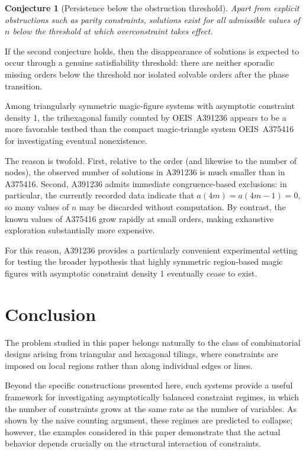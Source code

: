 \documentclass[11pt]{article}
\theoremstyle{plain}
\newtheorem{conjecture}[theorem]{Conjecture}
\theoremstyle{definition}
\begin{document}
\begin{conjecture}[Persistence below the obstruction threshold]
Apart from explicit obstructions such as parity constraints,
solutions exist for all admissible values of $n$ below the threshold
at which overconstraint takes effect.
\end{conjecture}

If the second conjecture holds, then the disappearance of solutions is
expected to occur through a genuine satisfiability threshold: there are
neither sporadic missing orders below the threshold nor isolated
solvable orders after the phase transition.


Among triangularly symmetric magic-figure systems with asymptotic
constraint density 1, the trihexagonal family counted by OEIS~A391236
appears to be a more favorable testbed than the compact magic-triangle
system OEIS~A375416 for investigating eventual nonexistence.

The reason is twofold. First, relative to the order (and likewise to the
number of nodes), the observed number of solutions in A391236 is much
smaller than in A375416. Second, A391236 admits immediate congruence-based
exclusions: in particular, the currently recorded data indicate that
$a(4m)=a(4m-1)=0$, so many values of $n$ may be discarded without
computation. By contrast, the known values of A375416 grow rapidly at
small orders, making exhaustive exploration substantially more expensive.

For this reason, A391236 provides a particularly convenient experimental
setting for testing the broader hypothesis that highly symmetric
region-based magic figures with asymptotic constraint density 1
eventually cease to exist.

\section{Conclusion}

The problem studied in this paper belongs naturally to the class of
combinatorial designs arising from triangular and hexagonal tilings,
where constraints are imposed on local regions rather than along
individual edges or lines.

Beyond the specific constructions presented here, such systems provide a
useful framework for investigating asymptotically balanced constraint
regimes, in which the number of constraints grows at the same rate as the
number of variables. As shown by the naive counting argument, these
regimes are predicted to collapse; however, the examples considered in
this paper demonstrate that the actual behavior depends crucially on the
structural interaction of constraints.
\end{document}
